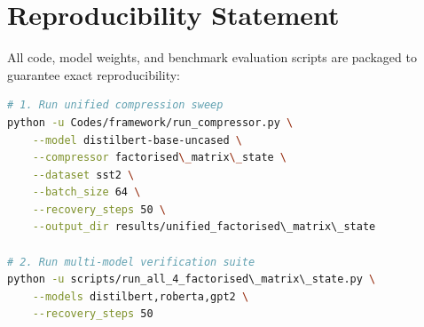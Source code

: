 \section{Reproducibility Statement}
All code, model weights, and benchmark evaluation scripts are packaged to guarantee exact reproducibility:
\begin{lstlisting}[language=bash]
# 1. Run unified compression sweep
python -u Codes/framework/run_compressor.py \
    --model distilbert-base-uncased \
    --compressor factorised\_matrix\_state \
    --dataset sst2 \
    --batch_size 64 \
    --recovery_steps 50 \
    --output_dir results/unified_factorised\_matrix\_state

# 2. Run multi-model verification suite
python -u scripts/run_all_4_factorised\_matrix\_state.py \
    --models distilbert,roberta,gpt2 \
    --recovery_steps 50
\end{lstlisting}
